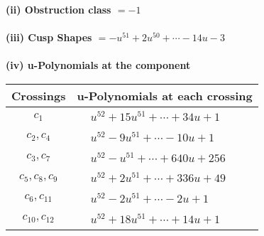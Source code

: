 \documentclass[1p]{elsarticle_modified}
\theoremstyle{definition}
\begin{document}
\flushleft \textbf{(ii) Obstruction class $= -1$}\\~\\
\flushleft \textbf{(iii) Cusp Shapes $= - u^{51}+2 u^{50}+\cdots-14 u-3$}\\~\\
\newpage\renewcommand{\arraystretch}{1}
\flushleft \textbf{(iv) u-Polynomials at the component}\newline \\
\begin{tabular}{m{50pt}|m{274pt}}
Crossings & \hspace{64pt}u-Polynomials at each crossing \\
\hline $$\begin{aligned}c_{1}\end{aligned}$$&$\begin{aligned}
&u^{52}+15 u^{51}+\cdots+34 u+1
\end{aligned}$\\
\hline $$\begin{aligned}c_{2},c_{4}\end{aligned}$$&$\begin{aligned}
&u^{52}-9 u^{51}+\cdots-10 u+1
\end{aligned}$\\
\hline $$\begin{aligned}c_{3},c_{7}\end{aligned}$$&$\begin{aligned}
&u^{52}- u^{51}+\cdots+640 u+256
\end{aligned}$\\
\hline $$\begin{aligned}c_{5},c_{8},c_{9}\end{aligned}$$&$\begin{aligned}
&u^{52}+2 u^{51}+\cdots+336 u+49
\end{aligned}$\\
\hline $$\begin{aligned}c_{6},c_{11}\end{aligned}$$&$\begin{aligned}
&u^{52}-2 u^{51}+\cdots-2 u+1
\end{aligned}$\\
\hline $$\begin{aligned}c_{10},c_{12}\end{aligned}$$&$\begin{aligned}
&u^{52}+18 u^{51}+\cdots+14 u+1
\end{aligned}$\\
\hline
\end{tabular}\\~\\
\end{document}
